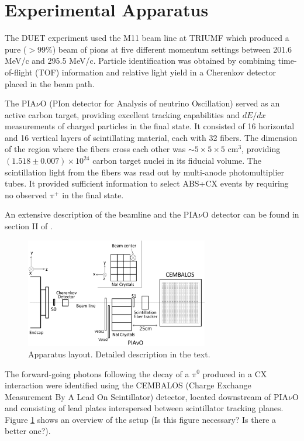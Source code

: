 \section{Experimental Apparatus}\label{sec:experiment}
The DUET experiment used the M11 beam line at TRIUMF which produced a pure ($>$99\%) beam of pions at five different momentum settings between 201.6 MeV/c and 295.5 MeV/c. Particle identification was obtained by combining time-of-flight (TOF) information and relative light yield in a Cherenkov detector placed in the beam path. 

The PIA$\nu$O (PIon detector for Analysis of neutrino Oscillation) served as an active carbon target, providing excellent tracking capabilities and $dE/dx$ measurements of charged particles in the final state. It consisted of 16 horizontal and 16 vertical layers of scintillating material, each with 32 fibers. The dimension of the region where the fibers cross each other was $\sim5\times5\times5$ cm$^3$, providing $(1.518\pm0.007)\times10^{24}$ carbon target nuclei in its fiducial volume. The scintillation light from the fibers was read out by multi-anode photomultiplier tubes. It provided sufficient information to select ABS+CX events by requiring no observed $\pi^{+}$ in the final state. 

An extensive description of the beamline and the PIA$\nu$O detector can be found in section II of \cite{duet}.

\begin{figure}[!h]
\begin{center}
\includegraphics[width=80mm]{figures/duet_setup3.eps}
\caption{Apparatus layout. Detailed description in the text.\label{fig:config}}
\end{center} 
\end{figure}

The forward-going photons following the decay of a $\pi^0$ produced in a CX interaction were identified using the CEMBALOS (Charge Exchange Measurement By A Lead On Scintillator) detector, located downstream of PIA$\nu$O and consisting of lead plates interspersed between scintillator tracking planes. Figure \ref{fig:config} shows an overview of the setup (Is this figure necessary? Is there a better one?).

